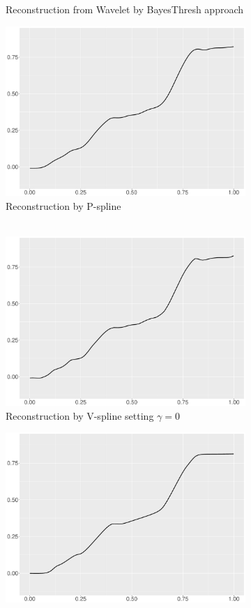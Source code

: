 \begin{figure}
\begin{subfigure}{0.45\textwidth}
    \caption{Reconstruction from Wavelet by BayesThresh approach}
    \end{subfigure}
    \begin{subfigure}{0.45\textwidth}
    \centering
    \includegraphics[width=\linewidth,height=0.45\textwidth]{Chapters/02TractorSplineTheory/plot/ggplot/ggBlocksPSpline.pdf}
    \caption{Reconstruction by P-spline \\ \mbox{  } }
    \end{subfigure}
    \begin{subfigure}{0.45\textwidth}
    \centering
    \includegraphics[width=\linewidth,height=0.45\textwidth]{Chapters/02TractorSplineTheory/plot/ggplot/ggBlocksGamma.pdf}
    \caption{Reconstruction by V-spline setting $\gamma=0$}
    \end{subfigure}
  \begin{subfigure}{0.45\textwidth}
    \centering
    \includegraphics[width=\linewidth,height=0.45\textwidth]{Chapters/02TractorSplineTheory/plot/ggplot/ggBlocksTractorAPT.pdf}

\end{subfigure}
\end{figure}
